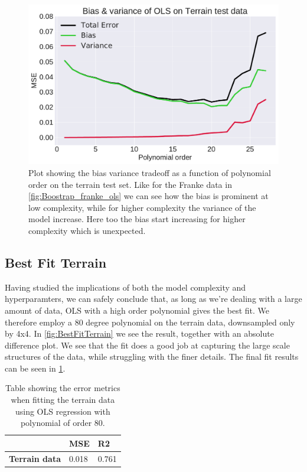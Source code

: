 \documentclass[10pt, twocolumn]{article}
\begin{document}
\begin{figure}[h!]
    \centering
    \includegraphics[scale=0.4]{../figs/BV_bootstrap_Terrain_OLS.pdf}
    \caption{Plot showing the bias variance tradeoff as a function of polynomial order on the terrain test set. Like for the Franke data in \cref{fig:Boostrap_franke_ols} we can see how the bias is prominent at low complexity, while for higher complexity the variance of the model increase. Here too the bias start increasing for higher complexity which is unexpected.}
    \label{fig:Bootstrap_terrain_ols}
\end{figure}



\subsection{Best Fit Terrain}
Having studied the implications of both the model complexity and hyperparamters, we can safely conclude that, as long as we're dealing with a large amount of data, OLS with a high order polynomial gives the best fit. We therefore employ a 80 degree polynomial on the terrain data, downsampled only by 4x4. In \cref{fig:BestFitTerrain} we see the result, together with an absolute difference plot. We see that the fit does a good job at capturing the large scale structures of the data, while struggling with the finer details. The final fit results can be seen in \cref{tab:error_metrics_terrain_data_higherorder}.

\begin{table}[h!]
\centering
\begin{tabular}{l|l|l|}
\cline{2-3}
                                            & \textbf{MSE} & \textbf{R2} \\ \hline
\multicolumn{1}{|l|}{\textbf{Terrain data}} & 0.018        & 0.761       \\ \hline
\end{tabular}
\caption{Table showing the error metrics when fitting the terrain data using OLS regression with polynomial of order 80.}
\label{tab:error_metrics_terrain_data_higherorder}
\end{table}
\end{document}
